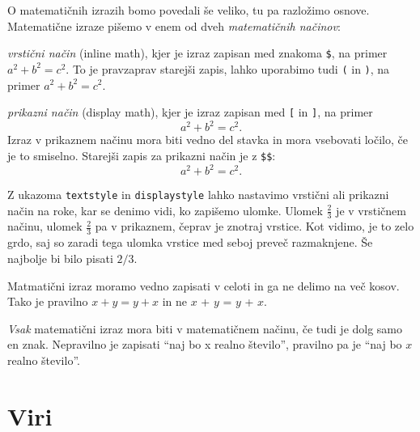 \documentclass[a4paper]{article}
\begin{document}
O matematičnih izrazih bomo povedali še veliko, tu pa razložimo osnove. Matematične izraze
pišemo v enem od dveh \emph{matematičnih načinov}:
%
\begin{description}
\item \emph{vrstični način} (inline math), kjer je izraz zapisan med znakoma \texttt{\$}, na
  primer $a^2 + b^2 = c^2$. To je pravzaprav starejši zapis, lahko uporabimo tudi
  \texttt{{}(} in \texttt{{})}, na primer \(a^2 + b^2 = c^2\).

\item \emph{prikazni način} (display math), kjer je izraz zapisan med \texttt{{}[} in
  \texttt{{}]}, na primer
  \[
    a^2 + b^2 = c^2.
  \]
  Izraz v prikaznem načinu mora biti vedno del stavka in mora vsebovati ločilo, če je to
  smiselno. Starejši zapis za prikazni način je z \texttt{\$\$}:
  $$
    a^2 + b^2 = c^2.
  $$
\end{description}

\noindent
%
Z ukazoma \texttt{{}textstyle} in \texttt{{}displaystyle} lahko nastavimo
vrstični ali prikazni način na roke, kar se denimo vidi, ko zapišemo ulomke. Ulomek
$\frac{2}{3}$ je v vrstičnem načinu, ulomek $\displaystyle \frac{2}{3}$ pa v prikaznem,
čeprav je znotraj vrstice. Kot vidimo, je to zelo grdo, saj so zaradi tega ulomka vrstice
med seboj preveč razmaknjene. Še najbolje bi bilo pisati $2/3$.

Matmatični izraz moramo vedno zapisati v celoti in ga ne delimo na več kosov. Tako je
pravilno $x + y = y + x$ in ne $x$ + $y$ = $y$ + $x$.

\emph{Vsak} matematični izraz mora biti v matematičnem načinu, če tudi je dolg samo en
znak. Nepravilno je zapisati ``naj bo x realno število'', pravilno pa je ``naj bo $x$
realno število''.


\section{Viri}
\end{document}

